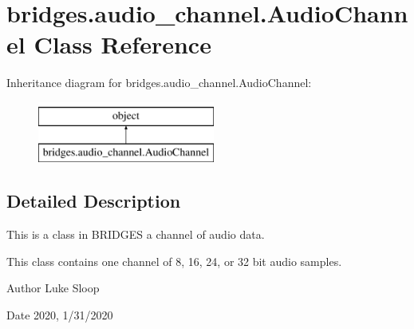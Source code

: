 \hypertarget{classbridges_1_1audio__channel_1_1_audio_channel}{}\section{bridges.\+audio\+\_\+channel.\+Audio\+Channel Class Reference}
\label{classbridges_1_1audio__channel_1_1_audio_channel}
Inheritance diagram for bridges.\+audio\+\_\+channel.\+Audio\+Channel\+:\begin{figure}[H]
\begin{center}
\leavevmode
\includegraphics[height=2.000000cm]{classbridges_1_1audio__channel_1_1_audio_channel}
\end{center}
\end{figure}


\subsection{Detailed Description}
This is a class in B\+R\+I\+D\+G\+ES a channel of audio data. 

This class contains one channel of 8, 16, 24, or 32 bit audio samples.

\begin{DoxyAuthor}{Author}
Luke Sloop
\end{DoxyAuthor}
\begin{DoxyDate}{Date}
2020, 1/31/2020 
\end{DoxyDate}
